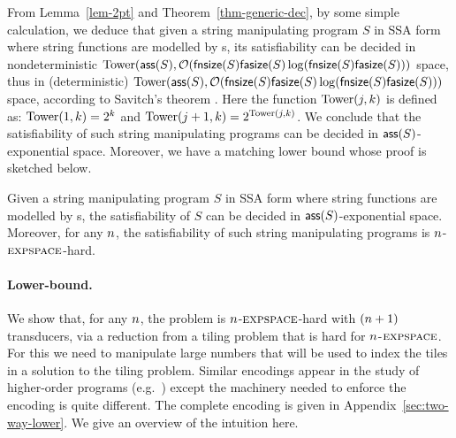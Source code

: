 From Lemma~\ref{lem-2pt} and Theorem~\ref{thm-generic-dec}, by some simple calculation, we deduce that given a string manipulating program $S$ in SSA form where string functions are modelled by \PPT{}s, its satisfiability can be decided in 
nondeterministic $\mathrm{Tower}(\mathsf{ass}(S), \mathcal{O}(\mathsf{fnsize}(S) \mathsf{fasize}(S) \log(\mathsf{fnsize}(S) \mathsf{fasize}(S)))$ space, thus in (deterministic) $\mathrm{Tower}(\mathsf{ass}(S), \mathcal{O}(\mathsf{fnsize}(S) \mathsf{fasize}(S) \log(\mathsf{fnsize}(S) \mathsf{fasize}(S)))$ space, according to Savitch's theorem \cite{Savitch70}. Here the function $\mathrm{Tower}(j, k)$ is %
defined as: $\mathrm{Tower}(1, k)= 2^k$ and $\mathrm{Tower}(j+1, k) = 2^{\mathrm{Tower}(j, k)}$. We conclude that the satisfiability of such string manipulating programs  can be decided in $\mathsf{ass}(S)$-exponential space.
Moreover, we have a matching lower bound whose proof is sketched below.
%
\begin{theorem}
Given a string manipulating program $S$ in SSA form where string functions are modelled by \PPT{}s, the satisfiability of $S$ can be decided in $\mathsf{ass}(S)$-exponential space. Moreover,  for any $n$, the satisfiability of such string manipulating programs is  %
 $n$-$\textsc{expspace}$-hard.
\end{theorem}

\paragraph{Lower-bound.}

We show that, for any $n$, the problem is $n$-$\textsc{expspace}$-hard with $(n+1)$ transducers, via a reduction from a tiling problem that is hard for $n$-$\textsc{expspace}$.
For this we need to manipulate large numbers that will be used to index the tiles in a solution to the tiling problem.
Similar encodings appear in the study of higher-order programs (e.g.~\cite{J01,CW07}) except the machinery needed to enforce the encoding is quite different.
The complete encoding is given in 
          {Appendix~\ref{sec:two-way-lower}}.
We give an overview of the intuition here.

